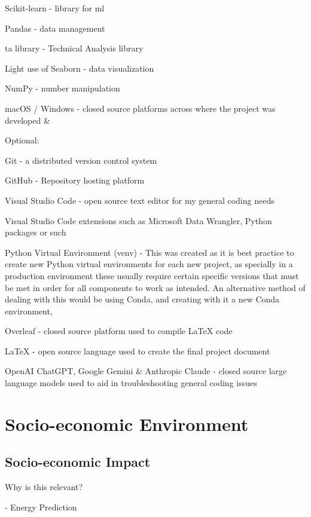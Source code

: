 \documentclass[12pt]{report} %
\begin{document}
Scikit-learn - library for ml \cite{scikit-learn}

Pandas - data management \cite{pandas}

ta library - Technical Analysis library\cite{ta-lib}

Light use of Seaborn - data visualization \cite{seaborn}

NumPy - number manipulation \cite{numpy}

macOS / Windows - closed source platforms across where the project was developed \cite{macos} \& \cite{windows}

Optional:

Git - a distributed version control system \cite{git}

GitHub - Repository hosting platform \cite{github}

Visual Studio Code - open source text editor for my general coding needs \cite{vscode}

Visual Studio Code extensions such as Microsoft Data Wrangler, Python packages or such

Python Virtual Environment (venv) - This was created as it is best practice to create new Python virtual environments for each new project, as specially in a production environment these usually require certain specific versions that must be met in order for all components to work as intended. An alternative method of dealing with this would be using Conda, and creating with it a new Conda environment, \cite{python_venv}

Overleaf - closed source platform used to compile LaTeX code \cite{overleaf}

LaTeX - open source language used to create the final project document \cite{latex}

OpenAI ChatGPT, Google Gemini \& Anthropic Claude - closed source large language models used to aid in troubleshooting general coding issues



\chapter{Socio-economic Environment}
\section{Socio-economic Impact}

Why is this relevant?

- Energy Prediction
\end{document}
